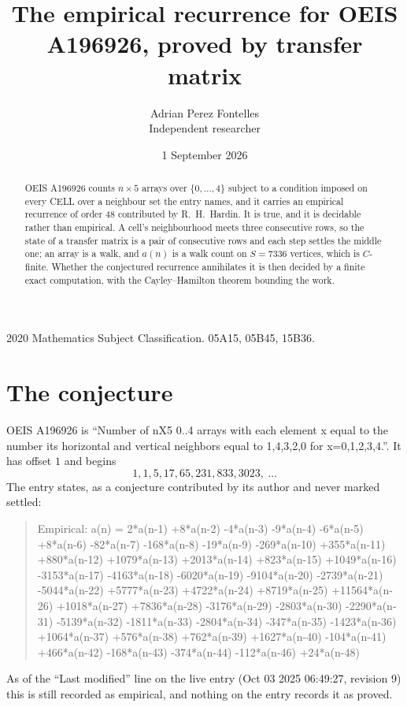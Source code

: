 \documentclass[11pt,a4paper]{article}
\title{The empirical recurrence for OEIS A196926, proved by transfer matrix}
\author{Adrian Perez Fontelles\\ \small Independent researcher}
\date{1 September 2026}
\theoremstyle{plain}
\theoremstyle{definition}
\begin{document}
\maketitle

\begin{abstract}
OEIS A196926 counts $n\times5$ arrays over $\{0,\dots,4\}$ subject to a condition imposed on
every CELL over a neighbour set the entry names, and it carries an empirical recurrence of
order $48$ contributed by R.~H.~Hardin. It is true, and it is decidable rather than
empirical. A cell's neighbourhood meets three consecutive rows, so the state of a transfer
matrix is a pair of consecutive rows and each step settles the middle one; an array is a
walk, and $a(n)$ is a walk count on $S=7336$ vertices, which is $C$-finite. Whether the
conjectured recurrence annihilates it is then decided by a finite exact computation, with the
Cayley--Hamilton theorem bounding the work.
\end{abstract}

\noindent\small 2020 Mathematics Subject Classification. 05A15, 05B45, 15B36.\normalsize

\section{The conjecture}

OEIS A196926 is ``Number of nX5 0..4 arrays with each element x equal to the number its horizontal and vertical neighbors equal to 1,4,3,2,0 for x=0,1,2,3,4.''. It has offset $1$ and begins
\[
1, 1, 5, 17, 65, 231, 833, 3023,\ \dots
\]
The entry states, as a conjecture contributed by its author and never marked settled:
\begin{quote}
Empirical: a(n) = 2*a(n-1) +8*a(n-2) -4*a(n-3) -9*a(n-4) -6*a(n-5) +8*a(n-6) -82*a(n-7) -168*a(n-8) -19*a(n-9) -269*a(n-10) +355*a(n-11) +880*a(n-12) +1079*a(n-13) +2013*a(n-14) +823*a(n-15) +1049*a(n-16) -3153*a(n-17) -4163*a(n-18) -6020*a(n-19) -9104*a(n-20) -2739*a(n-21) -5044*a(n-22) +5777*a(n-23) +4722*a(n-24) +8719*a(n-25) +11564*a(n-26) +1018*a(n-27) +7836*a(n-28) -3176*a(n-29) -2803*a(n-30) -2290*a(n-31) -5139*a(n-32) -1811*a(n-33) -2804*a(n-34) -347*a(n-35) -1423*a(n-36) +1064*a(n-37) +576*a(n-38) +762*a(n-39) +1627*a(n-40) -104*a(n-41) +466*a(n-42) -168*a(n-43) -374*a(n-44) -112*a(n-46) +24*a(n-48)
\end{quote}
As of the ``Last modified'' line on the live entry (Oct 03 2025 06:49:27, revision 9) this is still
recorded as empirical, and nothing on the entry records it as proved.
\end{document}

